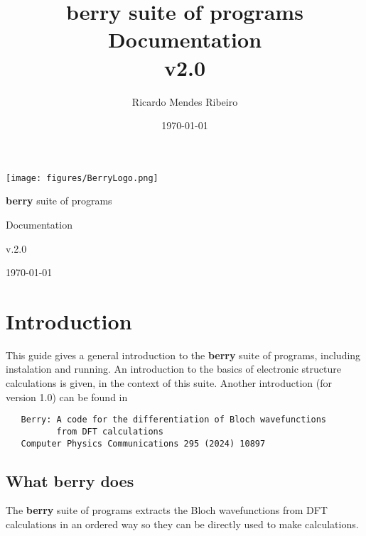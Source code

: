 \documentclass[a4paper,12pt]{report}
\title{{\bf berry} suite of programs\\
\large Documentation \\
v2.0}
\author{Ricardo Mendes Ribeiro}
\date{\today}
\begin{document}
\begin{titlepage}
 \begin{center}
 \texttt{[image: figures/BerryLogo.png]}
 \end{center}
\vspace*{2cm}

 \begin{center}
  \begin{Huge}{\bf berry} suite of programs\end{Huge}
  \vspace*{1cm}

 \begin{LARGE}Documentation\end{LARGE}
  \vspace*{1cm}

\begin{Huge}v.2.0\end{Huge}
  \vspace*{12cm}

\today
 \end{center}
\end{titlepage}

\tableofcontents

\chapter{Introduction}\label{ch:introduction}

 This guide gives a general introduction to the \textbf{berry} suite of programs, including instalation and running.
 An introduction to the basics of electronic structure calculations is given, in the context of this suite.
 Another introduction (for version 1.0) can be found in
  \medskip

 \begin{verbatim}
   Berry: A code for the differentiation of Bloch wavefunctions
          from DFT calculations
   Computer Physics Communications 295 (2024) 10897
 \end{verbatim}



\section{What \textbf{berry} does}

The \textbf{berry} suite of programs extracts the Bloch wavefunctions from DFT calculations in an ordered way
so they can be directly used to make calculations.
\end{document}
